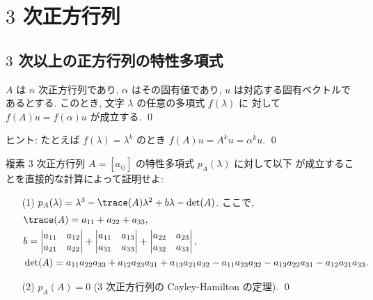\documentclass[12pt,twoside]{jarticle}
\begin{document}

\section{$3$ 次正方行列}
\label{sec:3x3}


\subsection{$3$ 次以上の正方行列の特性多項式}
\label{sec:char-polyn}


\begin{question}
  $A$ は $n$ 次正方行列であり, $\alpha$ はその固有値であり, 
  $u$ は対応する固有ベクトルであるとする. 
  このとき, 文字 $\lambda$ の任意の多項式 $f(\lambda)$ に
  対して $f(A)u=f(\alpha)u$ が成立する. 
  \qed
\end{question}

\noindent 
ヒント: たとえば $f(\lambda)=\lambda^k$ のとき $f(A)u = A^k u = \alpha^k u$.
\qed


\begin{question}\label{q:char-poly-3.1}
  複素 $3$ 次正方行列 $A=[a_{ij}]$ の特性多項式 $p_A(\lambda)$ に対して以下
  が成立することを直接的な計算によって証明せよ: 
  \begin{enumerate}
  \item[(1)] 
    $p_A(\lambda) = \lambda^3 - \trace(A)\lambda^2 + b\lambda - \det(A)$.
    ここで,
    \begin{align*}
      &
      \trace(A) = a_{11} + a_{22} + a_{33}, 
      \\ &
      b = 
      \begin{vmatrix}
        a_{11} & a_{12} \\
        a_{21} & a_{22} \\
      \end{vmatrix}
      +
      \begin{vmatrix}
        a_{11} & a_{13} \\
        a_{31} & a_{33} \\
      \end{vmatrix}
      +
      \begin{vmatrix}
        a_{22} & a_{23} \\
        a_{32} & a_{33} \\
      \end{vmatrix},
      \\ &
      \det(A) =
        a_{11}a_{22}a_{33}
      + a_{12}a_{23}a_{31}
      + a_{13}a_{21}a_{32}
      - a_{11}a_{23}a_{32}
      - a_{13}a_{22}a_{31}
      - a_{12}a_{21}a_{33}.
    \end{align*}
  \item[(2)] \( p_A(A) = 0 \) \quad ($3$ 次正方行列の Cayley-Hamilton の定理).
  \qed
  \end{enumerate}
\end{question}
\end{document}
